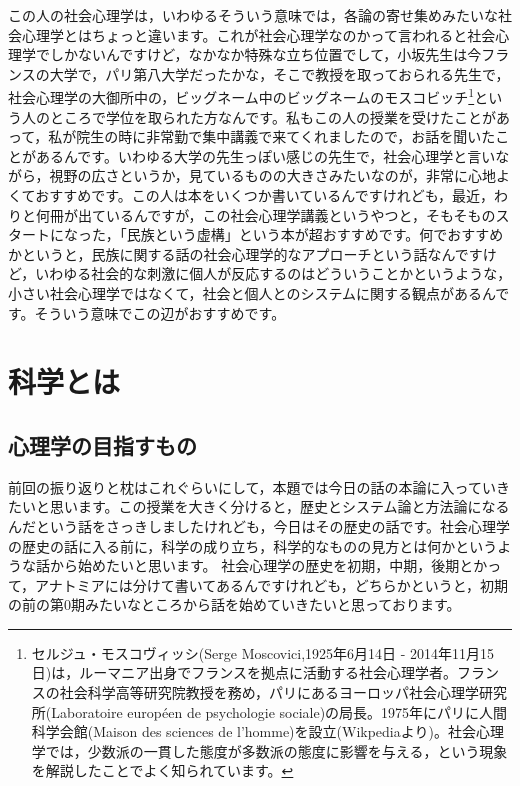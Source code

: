\documentclass{ltjsbook}
\begin{document}
この人の社会心理学は，いわゆるそういう意味では，各論の寄せ集めみたいな社会心理学とはちょっと違います。これが社会心理学なのかって言われると社会心理学でしかないんですけど，なかなか特殊な立ち位置でして，小坂先生は今フランスの大学で，パリ第八大学だったかな，そこで教授を取っておられる先生で，社会心理学の大御所中の，ビッグネーム中のビッグネームのモスコビッチ\footnote{セルジュ・モスコヴィッシ(Serge Moscovici,1925年6月14日 - 2014年11月15日)は，ルーマニア出身でフランスを拠点に活動する社会心理学者。フランスの社会科学高等研究院教授を務め，パリにあるヨーロッパ社会心理学研究所(Laboratoire européen de psychologie sociale)の局長。1975年にパリに人間科学会館(Maison des sciences de l’homme)を設立(Wikpediaより)。社会心理学では，少数派の一貫した態度が多数派の態度に影響を与える，という現象を解説したことでよく知られています。}という人のところで学位を取られた方なんです。私もこの人の授業を受けたことがあって，私が院生の時に非常勤で集中講義で来てくれましたので，お話を聞いたことがあるんです。いわゆる大学の先生っぽい感じの先生で，社会心理学と言いながら，視野の広さというか，見ているものの大きさみたいなのが，非常に心地よくておすすめです。この人は本をいくつか書いているんですけれども，最近，わりと何冊が出ているんですが，この社会心理学講義というやつと，そもそものスタートになった，「民族という虚構」という本\parencite{kosakai2}が超おすすめです。何でおすすめかというと，民族に関する話の社会心理学的なアプローチという話なんですけど，いわゆる社会的な刺激に個人が反応するのはどういうことかというような，小さい社会心理学ではなくて，社会と個人とのシステムに関する観点があるんです。そういう意味でこの辺がおすすめです。

\section{科学とは}
\subsection{心理学の目指すもの}
前回の振り返りと枕はこれぐらいにして，本題では今日の話の本論に入っていきたいと思います。この授業を大きく分けると，歴史とシステム論と方法論になるんだという話をさっきしましたけれども，今日はその歴史の話です。社会心理学の歴史の話に入る前に，科学の成り立ち，科学的なものの見方とは何かというような話から始めたいと思います。
社会心理学の歴史を初期，中期，後期とかって，アナトミア\parencite{anatomia}には分けて書いてあるんですけれども，どちらかというと，初期の前の第0期みたいなところから話を始めていきたいと思っております。
\end{document}

